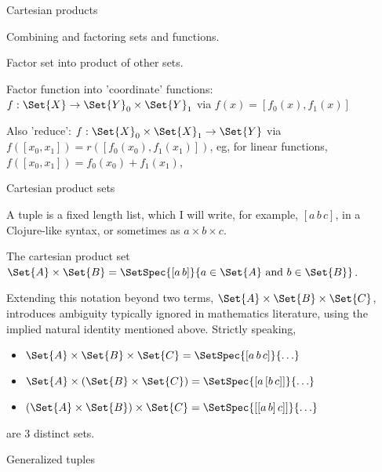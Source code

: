 \begin{plSection}{Cartesian products}
\label{sec:Cartesian-products}

Combining and factoring sets and functions.

Factor set into product of other sets.

Factor function into 'coordinate' functions:
$f : \Set{X} \rightarrow \Set{Y}_0 \times \Set{Y}_1$
via
$f \left( x \right) = 
\left[ f_0\left( x \right) , f_1\left( x \right) \right]$

Also 'reduce':
$f : \Set{X}_0 \times \Set{X}_1 \rightarrow \Set{Y}$
via 
 $f\left( \left[ x_0, x_1 \right] \right)
= r \left(
\left[ f_0 \left( x_0 \right) , f_1 \left( x_1 \right) \right] 
\right)$,
eg, for linear functions, 
 $f\left( \left[ x_0, x_1 \right] \right)
=  f_0 \left( x_0 \right) + f_1 \left( x_1 \right)$,

\begin{plSection}{Cartesian product sets}
\label{sec:Cartesian-product-sets}

A tuple is a fixed length list, which I will write, for example,
$[a \, b \, c]$, in a Clojure-like syntax,
or sometimes as $a \times b \times c$.

The cartesian product set 
$\Set{A} \times \Set{B} =
\SetSpec{[a \, b] }{ a \in \Set{A} \text{ and } b \in \Set{B} }$.

Extending this notation beyond two terms,
$\Set{A} \times \Set{B} \times \Set{C}$,
introduces ambiguity typically ignored in mathematics literature,
using the implied natural identity mentioned above.
Strictly speaking,
\begin{itemize}
  \item $\Set{A} \times \Set{B} \times \Set{C} = 
  \SetSpec{[a \, b \, c] }{ \ldots }$
  \item $\Set{A} \times (\Set{B} \times \Set{C}) = 
  \SetSpec{[a \, [b \,c]] }{ \ldots }$
  \item $(\Set{A} \times \Set{B}) \times \Set{C} = 
  \SetSpec{[[a \, b] \, c]] }{ \ldots }$
\end{itemize}
are 3 distinct sets.
\end{plSection}%
\begin{plSection}{Generalized tuples}
\label{sec:Generalized-tuples}


\end{plSection}
\end{plSection}
